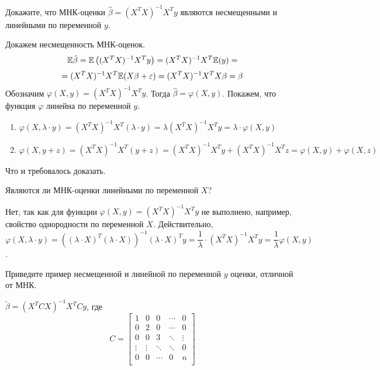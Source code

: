 \documentclass[pdftex,11pt,openany]{book}\usepackage[]{graphicx}\usepackage[]{color}
\begin{document}
\begin{problem}
Докажите, что МНК-оценки $\hat{\beta} = (X^T X)^{-1} X^T y$ являются несмещенными и линейными по переменной $y$.
\end{problem}

\begin{solution}
Докажем несмещенность МНК-оценок.
$$\mathbb{E}\hat{\beta} = \mathbb{E}\left( (X^T X)^{-1} X^T y \right) = (X^T X)^{-1} X^T \mathbb{E}(y) = $$
$$= (X^T X)^{-1} X^T \mathbb{E}(X\beta + \varepsilon) = (X^T X)^{-1} X^T X\beta = \beta$$
Обозначим $\varphi(X, y) = (X^T X)^{-1} X^T y$. Тогда $\hat{\beta} = \varphi(X, y)$. Покажем, что функция $\varphi$ линейна по переменной $y$.
\begin{enumerate}
\item $\varphi(X, \lambda \cdot y) = (X^T X)^{-1} X^T (\lambda \cdot y) = \lambda (X^T X)^{-1} X^T y = \lambda \cdot \varphi(X, y)$
\item $\varphi(X, y + z) = (X^T X)^{-1} X^T (y + z) = (X^T X)^{-1} X^T y + (X^T X)^{-1} X^T z = \varphi(X, y) + \varphi(X, z)$
\end{enumerate}
Что и требовалось доказать.
\end{solution}

\begin{problem}
Являются ли МНК-оценки линейными по переменной $X$?
\end{problem}

\begin{solution}
Нет, так как для функции $\varphi(X, y) = (X^T X)^{-1} X^T y$ не выполнено, например, свойство однородности по переменной $X$. Действительно,
$$\varphi(X, \lambda \cdot y) = ((\lambda \cdot X)^T (\lambda \cdot X))^{-1} (\lambda \cdot X)^T y = \frac{1}{\lambda} \cdot (X^T X)^{-1} X^T y = \frac{1}{\lambda} \varphi(X, y)$$.
\end{solution}

\begin{problem}
Приведите пример несмещенной и линейной по переменной $y$ оценки, отличной от МНК.
\end{problem}

\begin{solution} 
$\tilde{\beta} = (X^T CX)^{-1} X^T Cy$, где
$$C = \begin{bmatrix}
1 & 0 & 0 & \cdots & 0 \\
0 & 2 & 0 & \cdots & 0 \\
0 & 0 & 3 & \ddots & \vdots \\
\vdots & \vdots & \ddots & \ddots & 0 \\
0 & 0 & \cdots & 0 & n \\
\end{bmatrix} $$
\end{solution}
\end{document}
